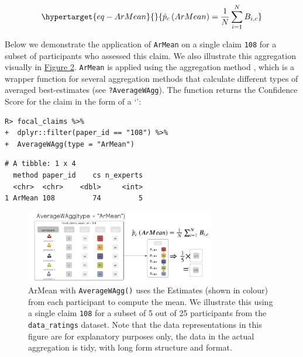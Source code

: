 \documentclass[article]{jss}
\newcommand{\class}[1]{`\code{#1}'}
\newcommand{\fct}[1]{\code{#1()}}
\begin{document}
\begin{equation}\protect\hypertarget{eq-ArMean}{}{
\hat{p}_c\left(ArMean \right ) = \frac{1}{N}\sum_{i=1}^N B_{i,c}
}\label{eq-ArMean}\end{equation}

Below we demonstrate the application of \texttt{ArMean} on a single
claim \texttt{108} for a subset of participants who assessed this claim.
We also illustrate this aggregation visually in
\protect\hyperlink{fig-ArMean}{Figure 2}. \texttt{ArMean} is applied
using the aggregation method \fct{AverageWAgg}, which is a wrapper
function for several aggregation methods that calculate different types
of averaged best-estimates (see \texttt{?AverageWAgg}). The function
returns the Confidence Score for the claim in the form of a
\class{tibble}:

\begin{verbatim}
R> focal_claims %>% 
+  dplyr::filter(paper_id == "108") %>%
+  AverageWAgg(type = "ArMean")
\end{verbatim}

\begin{verbatim}
# A tibble: 1 x 4
  method paper_id    cs n_experts
  <chr>  <chr>    <dbl>     <int>
1 ArMean 108         74         5
\end{verbatim}

\begin{figure}

{\centering \includegraphics[width=3.26in,height=\textheight]{images/ArMean.png}

}

\caption{\label{fig-ArMean}ArMean with \texttt{AverageWAgg()} uses the
Estimates (shown in colour) from each participant to compute the mean.
We illustrate this using a single claim \texttt{108} for a subset of 5
out of 25 participants from the \texttt{data\_ratings} dataset. Note
that the data representations in this figure are for explanatory
purposes only, the data in the actual aggregation is tidy, with long
form structure and format.}

\end{figure}
\end{document}
